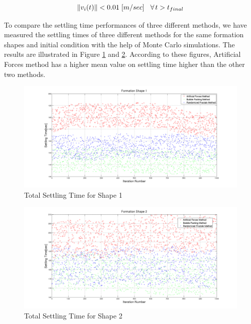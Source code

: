 \begin{equation}
\left\lVert v_i(t)\right\rVert < 0.01 \hspace{0.1cm} [m/sec] \hspace{0.3cm}\forall\hspace{0.05cm} t>t_{final}
\end{equation}
		
To compare the settling time performances of three different methods, we have measured the settling times of three different methods for the same formation shapes and initial condition with the help of Monte Carlo simulations. The results are illustrated in Figure \ref{settling_1} and \ref{settling_2}. According to these figures, Artificial Forces method has a higher mean value on settling time higher than the other two methods.
		
\begin{figure}[H]
\caption{Total Settling Time for Shape 1} \label{settling_1}
\centerline{\includegraphics[scale = 0.32]{Total_Time_Shape_1}}
\end{figure} 
		
\begin{figure}[H]
\caption{Total Settling Time for Shape 2} \label{settling_2}
\centerline{\includegraphics[scale = 0.32]{Total_Time_Shape_2}}
\end{figure} 

